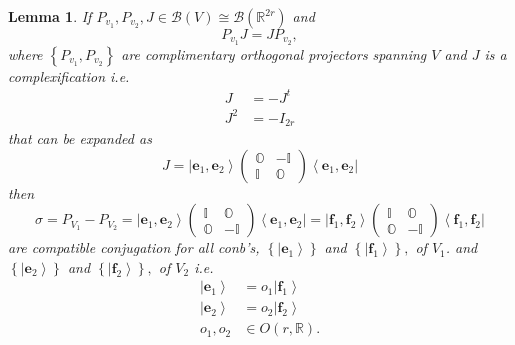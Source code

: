 \documentclass[aps,preprint]{revtex4}
\newtheorem{lemma}[theorem]{Lemma}
\begin{document}
\begin{lemma}
If $P_{v_{1}},P_{v_{2}},J\in \mathcal{B}\left( V\right) \cong \mathcal{B}%
\left( \mathbb{R}^{2r}\right) $ and 
\begin{equation}
P_{v_{1}}J=JP_{v_{2}},
\end{equation}%
where $\left\{ P_{v_{1}},P_{v_{2}}\right\} $ are complimentary orthogonal
projectors spanning $V$ and $J$ is a complexification i.e.%
\begin{align}
J& =-J^{t} \\
J^{2}& =-I_{2r}
\end{align}%
that can be expanded as 
\begin{equation}
J=\left\vert \mathbf{e}_{1},\mathbf{e}_{2}\right\rangle \left( 
\begin{array}{cc}
\mathbb{O} & -\mathbb{I} \\ 
\mathbb{I} & \mathbb{O}%
\end{array}%
\right) \left\langle \mathbf{e}_{1},\mathbf{e}_{2}\right\vert
\end{equation}%
then 
\begin{equation}
\sigma =P_{V_{1}}-P_{V_{2}}=\left\vert \mathbf{e}_{1},\mathbf{e}%
_{2}\right\rangle \left( 
\begin{array}{cc}
\mathbb{I} & \mathbb{O} \\ 
\mathbb{O} & -\mathbb{I}%
\end{array}%
\right) \left\langle \mathbf{e}_{1},\mathbf{e}_{2}\right\vert =\left\vert 
\mathbf{f}_{1},\mathbf{f}_{2}\right\rangle \left( 
\begin{array}{cc}
\mathbb{I} & \mathbb{O} \\ 
\mathbb{O} & -\mathbb{I}%
\end{array}%
\right) \left\langle \mathbf{f}_{1},\mathbf{f}_{2}\right\vert
\end{equation}%
\emph{are} \emph{compatible conjugation} for all conb's, $\left\{ \left\vert 
\mathbf{e}_{1}\right\rangle \right\} $ and $\left\{ \left\vert \mathbf{f}%
_{1}\right\rangle \right\} ,$ of $V_{1}$. and $\left\{ \left\vert \mathbf{e}%
_{2}\right\rangle \right\} $ and $\left\{ \left\vert \mathbf{f}%
_{2}\right\rangle \right\} ,$ of $V_{2}$ i.e. 
\begin{align}
\left\vert \mathbf{e}_{1}\right\rangle & =o_{1}\left\vert \mathbf{f}%
_{1}\right\rangle \\
\left\vert \mathbf{e}_{2}\right\rangle & =o_{2}\left\vert \mathbf{f}%
_{2}\right\rangle \\
o_{1},o_{2}& \in O\left( r,\mathbb{R}\right) .
\end{align}
\end{lemma}
\end{document}
